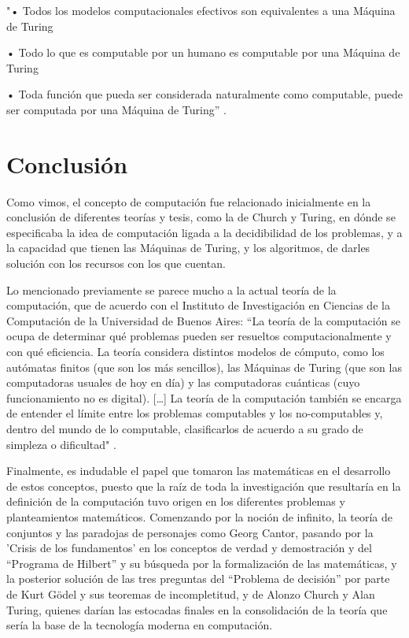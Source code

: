 \documentclass[11pt]{article}
\begin{document}
{"•  Todos los modelos computacionales efectivos son equivalentes a una Máquina de Turing

•	Todo lo que es computable por un humano es computable por una Máquina de Turing

•	Toda función que pueda ser considerada naturalmente como computable, puede ser computada por una Máquina de Turing” \citep{MonicaPrezi}.


\section{Conclusión}

Como vimos, el concepto de computación fue relacionado inicialmente en la conclusión de diferentes teorías y tesis, como la de Church y Turing, en dónde se especificaba la idea de computación ligada a la decidibilidad de los problemas, y a la capacidad que tienen las Máquinas de Turing, y los algoritmos, de darles solución con los recursos con los que cuentan.
\newline

Lo mencionado previamente se parece mucho a la actual teoría de la computación, que de acuerdo con el Instituto de Investigación en Ciencias de la Computación de la Universidad de Buenos Aires:  “La teoría de la computación se ocupa de determinar qué problemas pueden ser resueltos computacionalmente y con qué eficiencia. La teoría considera distintos modelos de cómputo, como los autómatas finitos (que son los más sencillos), las Máquinas de Turing (que son las computadoras usuales de hoy en día) y las computadoras cuánticas (cuyo funcionamiento no es digital). […] La teoría de la computación también se encarga de entender el límite entre los problemas computables y los no-computables y, dentro del mundo de lo computable, clasificarlos de acuerdo a su grado de simpleza o dificultad" \citep{Tcompticc}.
\newline

Finalmente, es indudable el papel que tomaron las matemáticas en el desarrollo de estos conceptos, puesto que la raíz de toda la investigación que resultaría en la definición de la computación tuvo origen en los diferentes problemas y planteamientos matemáticos. Comenzando por la noción de infinito, la teoría de conjuntos y las paradojas de personajes como Georg Cantor, pasando por la 'Crisis de los fundamentos' en los conceptos de verdad y demostración y del “Programa de Hilbert” y su búsqueda por la formalización de las matemáticas, y la posterior solución de las tres preguntas del “Problema de decisión” por parte de Kurt Gödel y sus teoremas de incompletitud, y de Alonzo Church y Alan Turing, quienes darían las estocadas finales en la consolidación de la teoría que sería la base de la tecnología moderna en computación.


}
\end{document}

